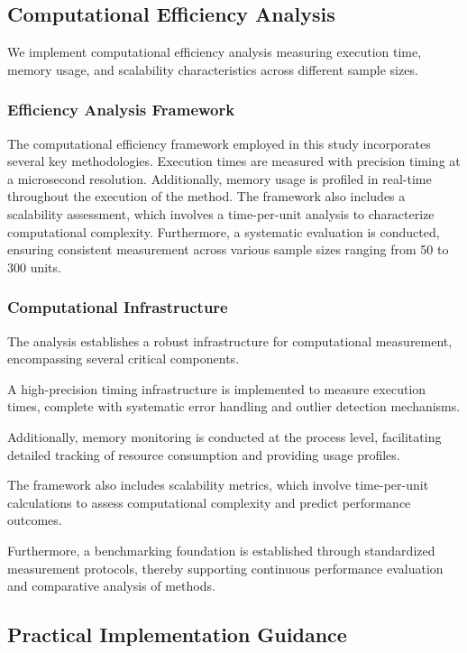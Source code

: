 \documentclass[final,3p,fleqn, 10pt]{elsarticle}
\begin{document}
\subsection{Computational Efficiency Analysis}

We implement computational efficiency analysis measuring execution time, memory usage, and scalability characteristics across different sample sizes.

\subsubsection{Efficiency Analysis Framework}

The computational efficiency framework employed in this study incorporates several key methodologies. Execution times are measured with precision timing at a microsecond resolution. Additionally, memory usage is profiled in real-time throughout the execution of the method. The framework also includes a scalability assessment, which involves a time-per-unit analysis to characterize computational complexity. Furthermore, a systematic evaluation is conducted, ensuring consistent measurement across various sample sizes ranging from 50 to 300 units.

\subsubsection{Computational Infrastructure}

The analysis establishes a robust infrastructure for computational measurement, encompassing several critical components.

A high-precision timing infrastructure is implemented to measure execution times, complete with systematic error handling and outlier detection mechanisms.

Additionally, memory monitoring is conducted at the process level, facilitating detailed tracking of resource consumption and providing usage profiles.

The framework also includes scalability metrics, which involve time-per-unit calculations to assess computational complexity and predict performance outcomes.

Furthermore, a benchmarking foundation is established through standardized measurement protocols, thereby supporting continuous performance evaluation and comparative analysis of methods.

\subsection{Practical Implementation Guidance}
\end{document}
